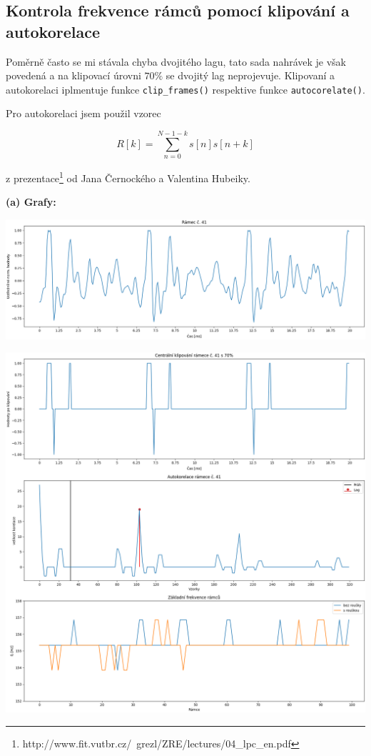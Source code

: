 \documentclass[12pt]{article}
\begin{document}
\subsection{Kontrola frekvence rámců pomocí klipování a autokorelace}
\hspace{1.5em}Poměrně často se mi stávala chyba dvojitého lagu, tato sada nahrávek je však povedená a na klipovací úrovni $70\%$ se dvojitý lag neprojevuje. Klipovaní a autokorelaci iplmentuje funkce \texttt{clip\_frames()} respektive funkce \texttt{autocorelate()}.

\hspace{1.5em}Pro autokorelaci jsem použil vzorec
\begin{center}
\vspace{-2em}
\[ R[k] = \sum_{n=0}^{N-1-k} s[n]s[n + k] \]
\end{center}
z prezentace\footnote[1]{http://www.fit.vutbr.cz/~grezl/ZRE/lectures/04\_lpc\_en.pdf} od Jana Černockého a Valentina Hubeiky.

\vspace{1em}
\textbf{(a) Grafy:}

\includegraphics[scale=0.44]{ukol4a.png}

\includegraphics[scale=0.44]{ukol4b.png}
\end{document}
